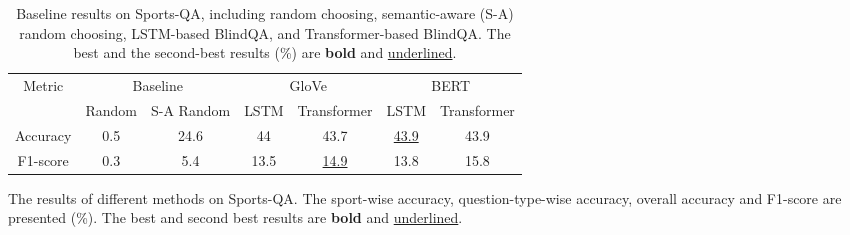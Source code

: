 {\begin{table}[tbp]
\caption{Baseline results on Sports-QA, including random choosing, semantic-aware (S-A) random choosing, LSTM-based BlindQA, and Transformer-based BlindQA. The best and the second-best results (\%) are \textbf{bold} and \underline{underlined}.} 
\label{bl}
\begin{tabular}{@{}ccccccc@{}}
\toprule
\multirow{2}{*}{Metric} & \multicolumn{2}{c}{Baseline} & \multicolumn{2}{c}{GloVe}            & \multicolumn{2}{c}{BERT}                    \\\cmidrule(l){2-3} \cmidrule(l){4-5} \cmidrule(l){6-7} 
                        & Random   & S-A Random   & LSTM & Transformer                   & LSTM                          & Transformer \\ \midrule
Accuracy                & 0.5      & 24.6         & 44   & 43.7                          & \underline{43.9} & 43.9        \\
F1-score                & 0.3      & 5.4          & 13.5 & \underline{14.9} & 13.8                          & 15.8        \\ \bottomrule
\end{tabular}
\end{table}





\begin{table*}[tbp]
\caption{The results of different methods on Sports-QA. The sport-wise accuracy, question-type-wise accuracy, overall accuracy and F1-score are presented (\%).
The best and second best results are \textbf{bold} and \underline{underlined}.} 
\label{res1}


\end{table*}}
